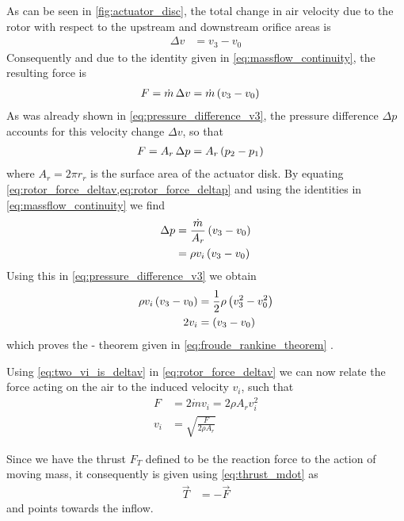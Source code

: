 As can be seen in \cref{fig:actuator_disc}, the total change in air velocity due to the rotor with respect to the upstream and downstream orifice areas is
%
\begin{align}
\Delta v &= v_3 - v_0
\end{align}
%
Consequently and due to the identity given in \cref{eq:massflow_continuity}, the resulting force is
%
\begin{align}
F &= \dot{m} \, \Delta v = \dot{m} \left( v_3 - v_0 \right) \label{eq:rotor_force_deltav}
\end{align}
%
As was already shown in \cref{eq:pressure_difference_v3}, the pressure difference $\Delta p$ accounts for this velocity change $\Delta v$, so that
%
\begin{align}
F &= A_r \, \Delta p = A_r \left( p_2 - p_1 \right) \label{eq:rotor_force_deltap}
\end{align}
%
where $A_r = 2 \pi r_r$ is the surface area of the actuator disk.
By equating \cref{eq:rotor_force_deltav,eq:rotor_force_deltap} and using the identities in \cref{eq:massflow_continuity} we find
%
\begin{align}
 \Delta p &= \frac{\dot{m}}{A_r} \left( v_3 - v_0 \right) \\
                      &= \rho v_i \left( v_3 - v_0 \right)
\end{align}
%
Using this in \cref{eq:pressure_difference_v3} we obtain
%
\begin{align}
\rho v_i \left( v_3 - v_0 \right) &= \frac{1}{2} \rho \left( v^2_3 - v^2_0 \right) \label{eq:froude_rankine_proof} \\
2 v_i &= \left( v_3 - v_0 \right) \label{eq:two_vi_is_deltav}
\end{align}
%
which proves the - theorem given in \cref{eq:froude_rankine_theorem} .

Using \cref{eq:two_vi_is_deltav} in \cref{eq:rotor_force_deltav} we can now relate the force acting on the air to the induced velocity $v_i$, such that
%
\begin{align}
F &= 2 \dot{m} v_i = 2 \rho A_r v^2_i \label{eq:thrust_mdot} \\
v_i &= \sqrt{\frac{F}{2 \rho A_r}}
\end{align}

Since we have the thrust $F_T$ defined to be the reaction force to the action of moving mass, it consequently is given using \cref{eq:thrust_mdot} as
%
\begin{align}
\vec{T} &= -\vec{F} \label{eq:thrust}
\end{align}
%
and points towards the inflow.

